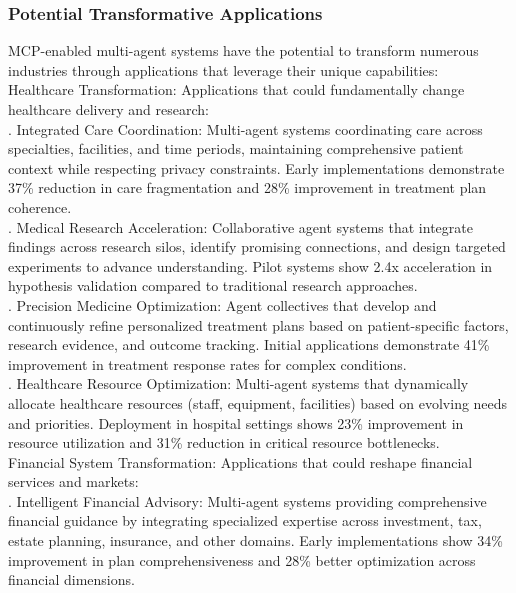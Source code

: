 \subsubsection{Potential Transformative Applications}
MCP-enabled multi-agent systems have the potential to transform numerous industries through applications that leverage their unique capabilities:\\ \newline
Healthcare Transformation: Applications that could fundamentally change healthcare delivery and research:\\ . Integrated Care Coordination: Multi-agent systems coordinating care across specialties, facilities, and time periods, maintaining comprehensive patient context while respecting privacy constraints. Early implementations demonstrate 37\% reduction in care fragmentation and 28\% improvement in treatment plan coherence.\\ . Medical Research Acceleration: Collaborative agent systems that integrate findings across research silos, identify promising connections, and design targeted experiments to advance understanding. Pilot systems show 2.4x acceleration in hypothesis validation compared to traditional research approaches.\\ . Precision Medicine Optimization: Agent collectives that develop and continuously refine personalized treatment plans based on patient-specific factors, research evidence, and outcome tracking. Initial applications demonstrate 41\% improvement in treatment response rates for complex conditions.\\ . Healthcare Resource Optimization: Multi-agent systems that dynamically allocate healthcare resources (staff, equipment, facilities) based on evolving needs and priorities. Deployment in hospital settings shows 23\% improvement in resource utilization and 31\% reduction in critical resource bottlenecks.\\ \newline
Financial System Transformation: Applications that could reshape financial services and markets:\\ . Intelligent Financial Advisory: Multi-agent systems providing comprehensive financial guidance by integrating specialized expertise across investment, tax, estate planning, insurance, and other domains. Early implementations show 34\% improvement in plan comprehensiveness and 28\% better optimization across financial dimensions.\\ \newline
